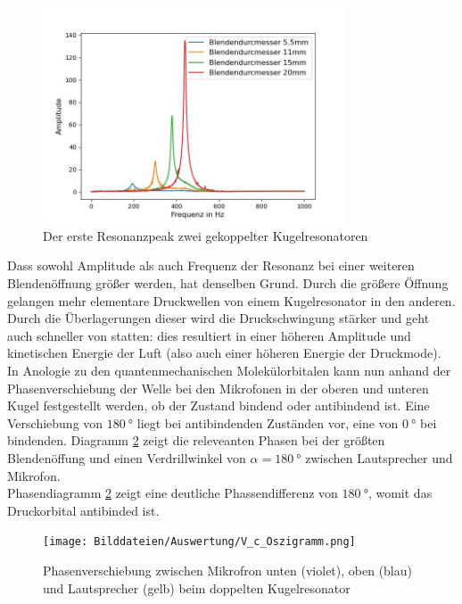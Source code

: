 \documentclass[../main.tex]{subfiles}
\begin{document}
        \begin{figure}[H]
            \centering
            \includegraphics[width=0.8\textwidth]{Bilddateien/Auswertung/IV_a_Spektren.jpg}
            \caption{Der erste Resonanzpeak zwei gekoppelter Kugelresonatoren }
            \label{fig:IV_a_Spektren}
        \end{figure}

        Dass sowohl Amplitude als auch Frequenz der Resonanz bei einer weiteren Blendenöffnung größer werden, hat denselben Grund. Durch die größere Öffnung gelangen mehr elementare Druckwellen von einem Kugelresonator in den anderen. Durch die Überlagerungen dieser wird die Druckschwingung stärker und geht auch schneller von statten: dies resultiert in einer höheren Amplitude und kinetischen Energie der Luft (also auch einer höheren Energie der Druckmode).\\
        
        In Anologie zu den quantenmechanischen Molekülorbitalen kann nun anhand der Phasenverschiebung der Welle bei den Mikrofonen in der oberen und unteren Kugel festgestellt werden, ob der Zustand bindend oder antibindend ist. Eine Verschiebung von $\SI{180}{\degree}$ liegt bei antibindenden 
        Zuständen vor, eine von $\SI{0}{\degree}$ bei bindenden. Diagramm \ref{fig:V_c_Oszigramm} zeigt die releveanten Phasen bei der größten Blendenöffung und einen Verdrillwinkel von $\alpha=\SI{180}{\degree}$ zwischen Lautsprecher und Mikrofon.\\

        Phasendiagramm \ref{fig:V_c_Oszigramm} zeigt eine deutliche Phassendifferenz von $\SI{180}{\degree}$, womit das Druckorbital antibinded ist.

        \begin{figure}[H]
            \centering
            \texttt{[image: Bilddateien/Auswertung/V\_c\_Oszigramm.png]}
            \caption{Phasenverschiebung zwischen Mikrofron unten (violet), oben (blau) und Lautsprecher (gelb) beim doppelten Kugelresonator}
            \label{fig:V_c_Oszigramm}
        \end{figure}
\end{document}
